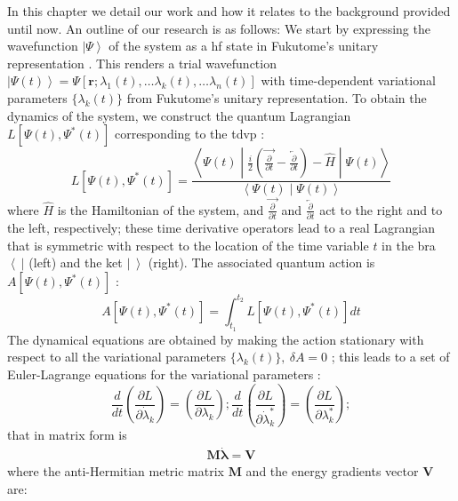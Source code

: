 \documentclass{aux/ttuthes2007}
\newcommand{\bra}[1]{\ensuremath{\left\langle#1\right\vert}}
\newcommand{\ket}[1]{\ensuremath{\left|#1\right\rangle}}
\newcommand{\braket}[2]{\left< #1 \middle\vert #2 \right>}
\newcommand{\sandwich}[3]{\left< #1 \middle\vert #2 \middle\vert #3 \right>}
\newcommand{\paren}[1]{\left( #1 \right)}
\newcommand{\ddt}{\frac{d}{dt}}
\newcommand{\pd}[1]{\frac{\partial}{\partial #1}}
\newcommand{\fpd}[2]{\frac{\partial #1}{\partial #2}}
\begin{document}
In this chapter we detail our work and how it relates to the background provided until now.
An outline of our research is as follows: We start by expressing the wavefunction $\ket\Psi$ of the system as a \gls{hf} state in Fukutome's unitary representation .
This renders a trial wavefunction $\ket{\Psi(t)} = \Psi \left[ \bm r; \lambda_1(t), \ldots \lambda_k(t), \ldots \lambda_n(t) \right]$ with time-dependent variational parameters $\{\lambda_k(t)\}$ from Fukutome's unitary representation.
To obtain the dynamics of the system, we construct the quantum Lagrangian $L\left [ \Psi(t), \Psi^*(t) \right]$ corresponding to the \gls{tdvp} :
\[
	L\left [ \Psi(t), \Psi^*(t) \right]
	= \frac{\sandwich{\Psi(t)}{\frac{i}{2}\left(\overrightarrow{\pd t} - \overleftarrow{\pd t}\right) - \hat H}{\Psi(t)}}{\braket{\Psi(t)}{\Psi(t)}}
\]
%
where $\hat H$ is the Hamiltonian of the system, and $\overrightarrow{\pd t}$ and $\overleftarrow{\pd t}$ act to the right and to the left, respectively;
these time derivative operators lead to a real Lagrangian that is symmetric with respect to the location of the time variable $t$ in the bra $\bra{\ }$ (left) and the ket $\ket{\ }$ (right).
The associated quantum action is $A \left[ \Psi(t), \Psi^*(t) \right]$ :
\[
	A\left [ \Psi(t), \Psi^*(t) \right]
	= \int_{t_1}^{t_2} L\left [ \Psi(t), \Psi^*(t) \right] dt
\]
%
The dynamical equations are obtained by making the action stationary with respect to all the variational parameters $\{\lambda_k(t)\},\ \delta A = 0$ ; this leads to a set of Euler-Lagrange equations for the variational parameters :
%
\[
	\ddt\paren{\fpd {L}{\dot \lambda_k}} = \paren{\fpd {L} {\lambda_k}};
	\ddt\paren{\fpd {L}{\dot \lambda_k^*}} = \paren{\fpd {L} {\lambda_k^*}};
\]
%
that in matrix form is
%
\begin{equation}
	\begin{split}
		\label{eq:ml=v}
		\bm M \dot {\bm \lambda} = \bm V
	\end{split}
\end{equation}
%
where the anti-Hermitian metric matrix $\bm M$ and the energy gradients vector $\bm V$ are:
\end{document}
